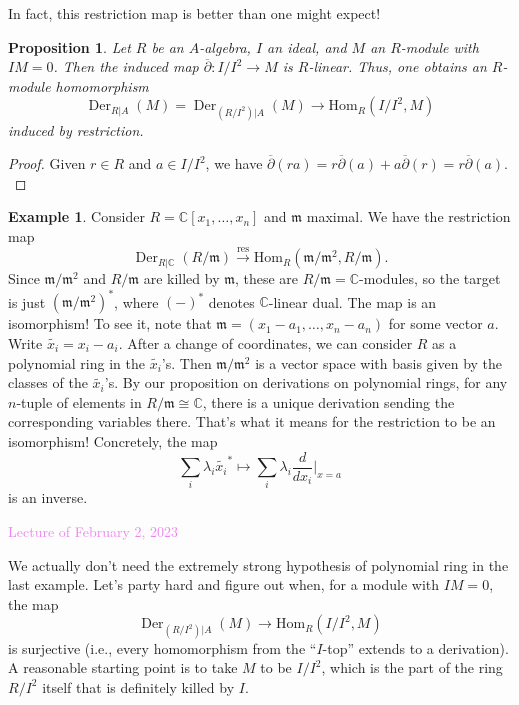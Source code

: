 \documentclass{amsart}[12pt]
\def\Der{\operatorname{Der}}
\newcommand{\Hom}{\mathrm{Hom}}
\newcommand{\Feb}[1]{\textcolor{violet}{Lecture of February #1, 2023}}
\newcommand{\C}{\mathbb{C}}
\newcommand{\fm}{{\mathfrak m}}
\numberwithin{equation}{section}
\theoremstyle{plain} %
\newtheorem{prop}[equation]{Proposition}
\theoremstyle{definition}
\newtheorem{ex}[equation]{Example}
\theoremstyle{remark}
\newcommand{\xra}[1]{\xrightarrow{#1}}
\def\res{\operatorname{res}}
\begin{document}
In fact, this restriction map is better than one might expect!

\begin{prop}
Let $R$ be an $A$-algebra, $I$ an ideal, and $M$ an $R$-module with $IM=0$. Then
the induced map $\overline{\partial}: I/I^2 \to M$ is $R$-linear. Thus, one obtains an $R$-module homomorphism
\[ \Der_{R|A}(M) = \Der_{(R/I^2)|A}(M) \to \Hom_R(I/I^2,M)\]
induced by restriction.
\end{prop}
\begin{proof}
Given $r\in R$ and $a\in I/I^2$, we have $\overline{\partial}(ra) = r \overline{\partial}(a) + a \overline{\partial}(r)= r \overline{\partial}(a).$
\end{proof}


\begin{ex} Consider $R=\C[x_1,\dots,x_n]$ and $\fm$ maximal. We have the restriction map
\[ \Der_{R|\C}(R/\fm) \xra{\res} \Hom_{R}(\fm/\fm^2,R/\fm).\]
Since $\fm/\fm^2$ and $R/\fm$ are killed by $\fm$, these are $R/\fm=\C$-modules, so the target is just $(\fm/\fm^2)^*$,
where $(-)^*$ denotes $\C$-linear dual. The map is an isomorphism! To see it, note that $\fm=(x_1-a_1,\dots,x_n-a_n)$ for some vector $a$. Write $\widetilde{x_i}=x_i-a_i$. After a change of coordinates, we can consider $R$ as a polynomial ring in the $\widetilde{x_i}$'s. Then $\fm/\fm^2$ is a vector space with basis given by the classes of the $\widetilde{x_i}$'s.  By our proposition on derivations on polynomial rings, for any $n$-tuple of elements in $R/\fm\cong \C$, there is a unique derivation sending the corresponding variables there. That's what it means for the restriction to be an isomorphism! Concretely, the map
\[ \sum_i \lambda_i \widetilde{x_i}^* \mapsto \sum_i \lambda_i \frac{d}{dx_i}|_{x=a} \]
is an inverse.
\end{ex}

\Feb{2}

We actually don't need the extremely strong hypothesis of polynomial ring in the last example. Let's party hard and figure out when, for a module with $IM=0$, the map
\[ \Der_{(R/I^2)|A}(M) \to \Hom_R(I/I^2,M)\]
is surjective (i.e., every homomorphism from the ``$I$-top'' extends to a derivation).
A reasonable starting point is to take $M$ to be $I/I^2$, which is the part of the ring $R/I^2$ itself that is definitely killed by $I$.
\end{document}
